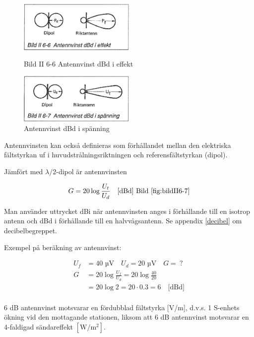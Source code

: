 \begin{figure}
  \includegraphics[width=0.5\textwidth]{images/bild_2_6-06}
  \caption{Bild II 6-6 Antennvinst dBd i effekt}
  \label{fig:bildII6-6}

  \includegraphics[width=0.5\textwidth]{images/bild_2_6-07}
  \caption{Antennvinst dBd i spänning}
  \label{fig:bildII6-7}
\end{figure}

Antennvinsten kan också definieras som förhållandet mellan den
elektriska fältstyrkan uf i huvudstrålningsriktningen och
referensfältstyrkan (dipol).

Jämfört med \(\lambda/2\)-dipol är antennvinsten

\[G = 20 \log\frac{U_t}{U_d} \quad \text{[dBd] Bild \ref{fig:bildII6-7}}\]

Man använder uttrycket dBi när antennvinsten anges i förhållande till
en isotrop antenn och dBd i förhållande till en halvvågsantenn.  Se
appendix \ref{decibel} om decibelbegreppet.

Exempel på beräkning av antennvinst:

\begin{align*}
  U_f &= 40\text{ µV} \quad U_d = 20\text{ µV} \quad G =\ ? \\
  G &= 20 \log\frac{U_f}{U_d} = 20 \log\frac{40}{20} \\
  &= 20 \log 2 = 20\cdot 0.3 = 6 \quad \text{[dBd]} \\
\end{align*}

6 dB antennvinst motsvarar en fördubblad fältstyrka [V/m], d.v.s. 1
S-enhets ökning vid den mottagande stationen, liksom att 6 dB
antennvinst motsvarar en 4-faldigad sändareffekt \(\mathrm{[W/m^2]}\).

